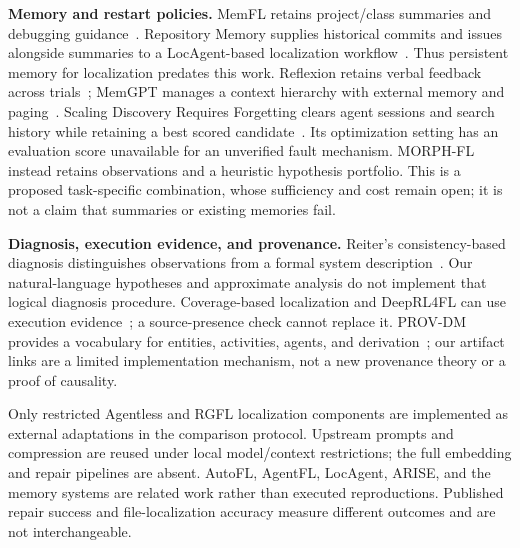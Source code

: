 \documentclass[letterpaper,journal]{IEEEtran}
\newcommand{\tool}{MORPH-FL}
\begin{document}
\textbf{Memory and restart policies.} MemFL retains project/class summaries and debugging guidance~\cite{memfl2025}. Repository Memory supplies historical commits and issues alongside summaries to a LocAgent-based localization workflow~\cite{repomem2026}. Thus persistent memory for localization predates this work. Reflexion retains verbal feedback across trials~\cite{reflexion2023}; MemGPT manages a context hierarchy with external memory and paging~\cite{memgpt2024}. Scaling Discovery Requires Forgetting clears agent sessions and search history while retaining a best scored candidate~\cite{forgetting2026}. Its optimization setting has an evaluation score unavailable for an unverified fault mechanism. \tool{} instead retains observations and a heuristic hypothesis portfolio. This is a proposed task-specific combination, whose sufficiency and cost remain open; it is not a claim that summaries or existing memories fail.

\textbf{Diagnosis, execution evidence, and provenance.} Reiter's consistency-based diagnosis distinguishes observations from a formal system description~\cite{reiter1987}. Our natural-language hypotheses and approximate analysis do not implement that logical diagnosis procedure. Coverage-based localization and DeepRL4FL can use execution evidence~\cite{deeprl4fl2021}; a source-presence check cannot replace it. PROV-DM provides a vocabulary for entities, activities, agents, and derivation~\cite{prov2013}; our artifact links are a limited implementation mechanism, not a new provenance theory or a proof of causality.

Only restricted Agentless and RGFL localization components are implemented as external adaptations in the comparison protocol. Upstream prompts and compression are reused under local model/context restrictions; the full embedding and repair pipelines are absent. AutoFL, AgentFL, LocAgent, ARISE, and the memory systems are related work rather than executed reproductions. Published repair success and file-localization accuracy measure different outcomes and are not interchangeable.
\end{document}
